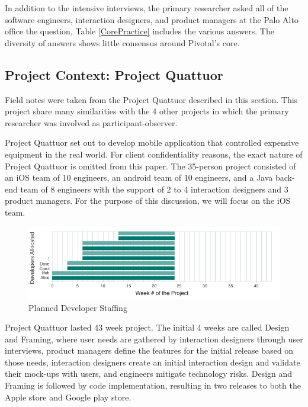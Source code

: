 In addition to the intensive interviews, the primary researcher asked all of the software engineers, interaction designers, and product managers at the Palo Alto office the question,  Table \ref{CorePractice} includes the various answers. The diversity of answers shows little consensus around Pivotal's core. 

\subsection{Project Context: Project Quattuor}
Field notes were taken from the Project Quattuor described in this section. This project share many similarities with the 4 other projects in which the primary researcher was involved as participant-observer.

\label{ExampleInAction}
Project Quattuor set out to develop mobile application that controlled expensive equipment in the real world. For client confidentiality reasons, the exact nature of Project Quattuor is omitted from this paper. 
The 35-person project consisted of an iOS team of 10 engineers, an android team of 10 engineers, and a Java back-end team of 8 engineers with the support of 2 to 4 interaction designers and 3 product managers. For the purpose of this discussion, we will focus on the iOS team. 

\begin{figure}[t]
\centering
\includegraphics[width=7.1in]{OriginalDeveloperStaffingV2.jpg}
\caption{Planned Developer Staffing}
\label{PlannedDeveloperStaffing}
\end{figure}

Project Quattuor lasted 43 week project. The initial 4 weeks are called Design and Framing, where user needs are gathered by interaction designers through user interviews, product managers define the features for the initial release based on those needs, interaction designers create an initial interaction design and validate their mock-ups with users, and engineers mitigate technology risks. Design and Framing is followed by code implementation, resulting in two releases to both the Apple store and Google play store.

